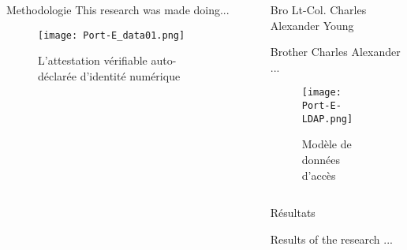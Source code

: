\documentclass[final]{beamer}
\newlength{\sepwid}
\newlength{\onecolwid}
\newlength{\twocolwid}
\begin{document}
\begin{frame}[t]
\begin{columns}[t]
\begin{column}{\onecolwid}
\begin{block}{Methodologie}
This research was made doing... 

\begin{figure}
\texttt{[image: Port-E\_data01.png]}
\caption{ L'attestation vérifiable auto-déclarée d'identité numérique} 
\end{figure}

\end{block}

\end{column} %


\begin{column}{\sepwid}\end{column} %

\begin{column}{\twocolwid} %


\begin{alertblock}{Bro Lt-Col. Charles Alexander Young}

Brother Charles Alexander ...

\end{alertblock} 

\begin{figure}
\texttt{[image: Port-E-LDAP.png]}
\caption{ Modèle de données d'accès}
\end{figure}


\begin{columns}[t,totalwidth=\twocolwid] %

\begin{column}{\onecolwid} %



\begin{block}{Résultats}

Results of the research ...
\end{block}




\end{column}
\end{columns}
\end{column}
\end{columns}
\end{frame}
\end{document}
